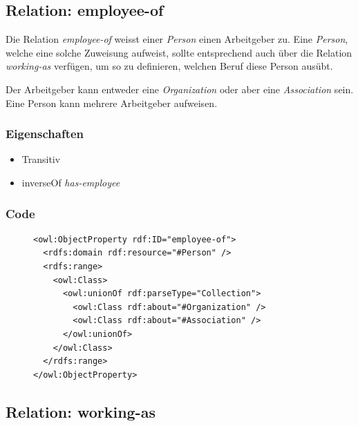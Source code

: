 \documentclass[
    11pt,
    latin1,
    a4paper,
    oneside
]{scrreprt}
\begin{document}
\subsection{Relation: employee-of} \label{sec:rel_employeeof}

Die Relation \emph{employee-of} weisst einer \emph{Person} einen Arbeitgeber zu. Eine \emph{Person}, welche eine solche Zuweisung aufweist, sollte entsprechend auch über die Relation \emph{working-as} verf\"ugen, um so zu definieren, welchen Beruf diese Person aus\"ubt.

Der Arbeitgeber kann entweder eine \emph{Organization} oder aber eine \emph{Association} sein. Eine Person kann mehrere Arbeitgeber aufweisen.

\subsubsection{Eigenschaften} \label{sec:rel_employeeof_settings}

\begin{itemize}
  \item Transitiv
  \item inverseOf \emph{has-employee}
\end{itemize}

\subsubsection{Code} \label{sec:rel_employeeof_code}

\begin{figure}[H]
 \lstset{language=XML}
 \begin{lstlisting}[label=owl:employeeof,caption={Die Relation \emph{employee-of} gibt an, bei welcher \emph{Organization} oder \emph{Association} die Person angestellt ist}]
<owl:ObjectProperty rdf:ID="employee-of">
  <rdfs:domain rdf:resource="#Person" />
  <rdfs:range>
    <owl:Class>
      <owl:unionOf rdf:parseType="Collection">
        <owl:Class rdf:about="#Organization" />
        <owl:Class rdf:about="#Association" />
      </owl:unionOf>
    </owl:Class>
  </rdfs:range>
</owl:ObjectProperty>
 \end{lstlisting}
\end{figure}


\subsection{Relation: working-as} \label{sec:rel_workingas}
\end{document}
